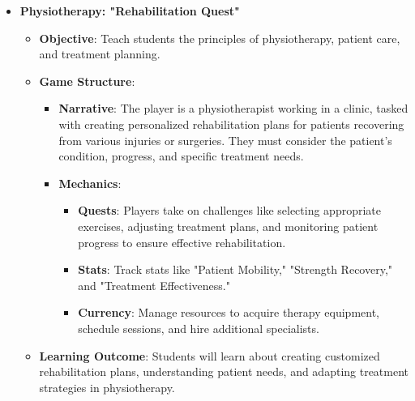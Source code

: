 \begin{itemize}
    \item \textbf{Physiotherapy: "Rehabilitation Quest"}
    \begin{itemize}
        \item \textbf{Objective}: Teach students the principles of physiotherapy, patient care, and treatment planning.
        \item \textbf{Game Structure}:
        \begin{itemize}
            \item \textbf{Narrative}: The player is a physiotherapist working in a clinic, tasked with creating personalized rehabilitation plans for patients recovering from various injuries or surgeries. They must consider the patient's condition, progress, and specific treatment needs.
            \item \textbf{Mechanics}: 
            \begin{itemize}
                \item \textbf{Quests}: Players take on challenges like selecting appropriate exercises, adjusting treatment plans, and monitoring patient progress to ensure effective rehabilitation.
                \item \textbf{Stats}: Track stats like "Patient Mobility," "Strength Recovery," and "Treatment Effectiveness."
                \item \textbf{Currency}: Manage resources to acquire therapy equipment, schedule sessions, and hire additional specialists.
            \end{itemize}
        \end{itemize}
        \item \textbf{Learning Outcome}: Students will learn about creating customized rehabilitation plans, understanding patient needs, and adapting treatment strategies in physiotherapy.
    \end{itemize}
\end{itemize}